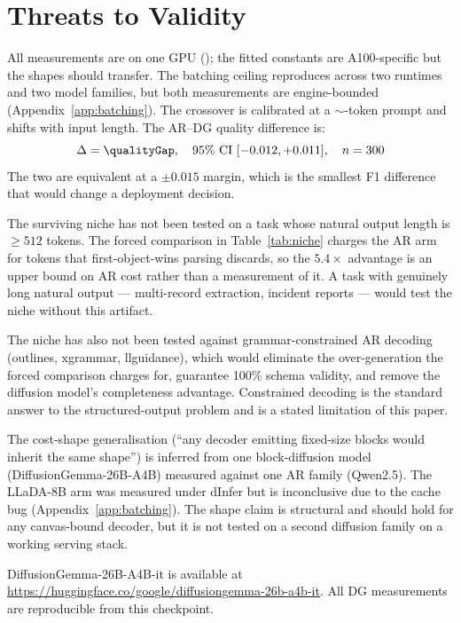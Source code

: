 \section{Threats to Validity}
\label{sec:threats}

All measurements are on one GPU (\gpuModel{}); the fitted constants are
A100-specific but the shapes should transfer. The batching ceiling
reproduces across two runtimes and two model families, but both
measurements are engine-bounded (Appendix~\ref{app:batching}). The
crossover is calibrated at a $\sim$-token prompt and shifts
with input length. The AR--DG quality difference is:
\begin{equation}
\Delta = \qualityGap, \quad \text{95\% CI } [-0.012, +0.011], \quad n = 300
\end{equation}
The two are equivalent at a $\pm 0.015$ margin, which is the smallest F1
difference that would change a deployment decision.

The surviving niche has not been tested on a task whose natural output
length is $\geq 512$ tokens. The forced comparison in
Table~\ref{tab:niche} charges the AR arm for tokens that first-object-wins
parsing discards, so the $5.4\times$ advantage is an upper bound on AR
cost rather than a measurement of it. A task with genuinely long natural
output --- multi-record extraction, incident reports --- would test the
niche without this artifact.

The niche has also not been tested against grammar-constrained AR decoding
(outlines, xgrammar, llguidance), which would eliminate the over-generation
the forced comparison charges for, guarantee 100\% schema validity, and
remove the diffusion model's completeness advantage. Constrained decoding
is the standard answer to the structured-output problem and is a stated
limitation of this paper.

The cost-shape generalisation (``any decoder emitting fixed-size blocks
would inherit the same shape'') is inferred from one block-diffusion model
(DiffusionGemma-26B-A4B) measured against one AR family (Qwen2.5). The
LLaDA-8B arm was measured under dInfer but is inconclusive due to the
cache bug (Appendix~\ref{app:batching}). The shape claim is structural
and should hold for any canvas-bound decoder, but it is not tested on a
second diffusion family on a working serving stack.

DiffusionGemma-26B-A4B-it is available at
\url{https://huggingface.co/google/diffusiongemma-26b-a4b-it}. All DG
measurements are reproducible from this checkpoint.
